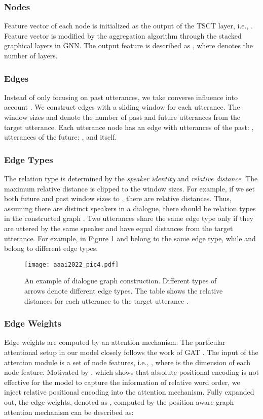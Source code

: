 \documentclass[letterpaper]{article} \usepackage{aaai22}  \usepackage{times}  \usepackage{helvet}  \usepackage{courier}  \usepackage[hyphens]{url}  \usepackage{graphicx} \urlstyle{rm} \def\UrlFont{\rm}  \usepackage{natbib}  \usepackage{caption} \DeclareCaptionStyle{ruled}{labelfont=normalfont,labelsep=colon,strut=off} \frenchspacing  \setlength{\pdfpagewidth}{8.5in}  \setlength{\pdfpageheight}{11in}  \usepackage{algorithm}
\begin{document}
\subsubsection{Nodes}
 Feature vector  of each node  is initialized as the output of the TSCT layer, i.e., . Feature vector  is modified by the aggregation algorithm through the stacked graphical layers in GNN.
 The output feature is described as , where  denotes the number of layers.


\subsubsection{Edges}
Instead of only focusing on past utterances, we take converse influence into account \cite{dialoguegcn}. 
We construct edges  with a sliding window for each utterance. The window sizes  and  denote the number of past and future utterances from the target utterance. Each utterance node  has an edge  with  utterances of the past:  ,   utterances of the future: , and itself.

\subsubsection{Edge Types} The relation type  is determined by the \textit{speaker identity} and \textit{relative distance}. The maximum relative distance is clipped to the window sizes. For example, if we set both future and past window sizes to , there are  relative distances. Thus, assuming there are  distinct speakers in a dialogue, there should be  relation types in the constructed graph .
Two utterances share the same edge type only if they are uttered by the same speaker and have equal distances from the target utterance.
For example, in Figure \ref{fig4}  and  belong to the same edge type, while  and  belong to different edge types.

\begin{figure}[t]
\centering
\texttt{[image: aaai2022\_pic4.pdf]} \caption{An example of dialogue graph construction. Different types of arrows denote different edge types. The table shows the relative distances for each utterance to the target utterance .}
\label{fig4}
\end{figure}


\subsubsection{Edge Weights} Edge weights are computed by an attention mechanism. 
The particular attentional setup in our model closely follows the work of GAT \cite{gat}. The input of the attention module is a set of node features, i.e., , where  is the dimension of each node feature. Motivated by \cite{shaw}, which shows that absolute positional encoding is not effective for the model to capture the information of relative word order, we inject relative positional encoding into the attention mechanism. Fully expanded out, the edge weights, denoted as , computed by the position-aware graph attention mechanism can be described as:
\end{document}
